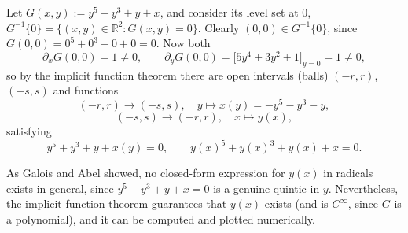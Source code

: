 \begin{center}
\end{center}

\begin{example}
Let $G(x,y) := y^5+y^3+y+x$, and consider its level set at $0$,
$G^{-1}\{0\} = \{(x,y)\in\mathbb{R}^2 : G(x,y)=0\}$. Clearly $(0,0)\in G^{-1}\{0\}$, since
$G(0,0)=0^5+0^3+0+0=0$. Now both
\[\partial_xG(0,0)=1\neq0, \qquad \partial_yG(0,0)=\big[5y^4+3y^2+1\big]_{y=0}=1\neq0,\]
so by the implicit function theorem there are open intervals (balls) $(-r,r)$, $(-s,s)$ and
functions
\[(-r,r)\to(-s,s), \quad y\mapsto x(y) = -y^5-y^3-y,\]
\[(-s,s)\to(-r,r), \quad x\mapsto y(x),\]
satisfying
\[y^5+y^3+y+x(y)=0, \qquad y(x)^5+y(x)^3+y(x)+x=0.\]

\begin{remark}
As Galois and Abel showed, no closed-form expression for $y(x)$ in radicals exists in general,
since $y^5+y^3+y+x=0$ is a genuine quintic in $y$. Nevertheless, the implicit function theorem
guarantees that $y(x)$ exists (and is $C^\infty$, since $G$ is a polynomial), and it can be
computed and plotted numerically.
\end{remark}
\end{example}

